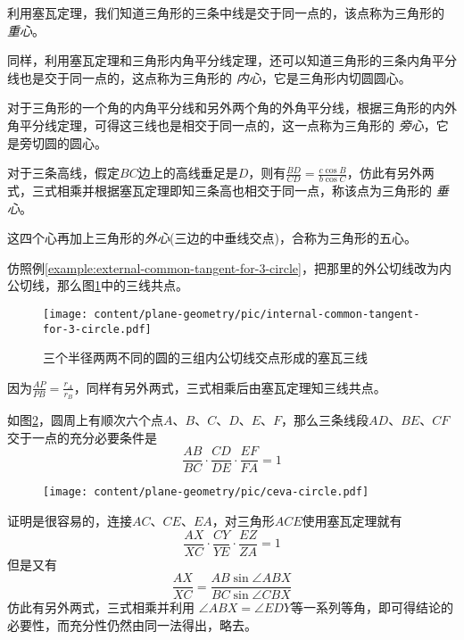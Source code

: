 \begin{example}[三角形的几个心]
 利用塞瓦定理，我们知道三角形的三条中线是交于同一点的，该点称为三角形的 \emph{重心}。

 同样，利用塞瓦定理和三角形内角平分线定理，还可以知道三角形的三条内角平分线也是交于同一点的，这点称为三角形的 \emph{内心}，它是三角形内切圆圆心。

 对于三角形的一个角的内角平分线和另外两个角的外角平分线，根据三角形的内外角平分线定理，可得这三线也是相交于同一点的，这一点称为三角形的 \emph{旁心}，它是旁切圆的圆心。

 对于三条高线，假定$BC$边上的高线垂足是$D$，则有$\frac{BD}{CD}=\frac{c \cos{B}}{b \cos{C}}$，仿此有另外两式，三式相乘并根据塞瓦定理即知三条高也相交于同一点，称该点为三角形的 \emph{垂心}。

这四个心再加上三角形的\emph{外心}(三边的中垂线交点)，合称为三角形的五心。 
\end{example}

\begin{example}
  仿照例\ref{example:external-common-tangent-for-3-circle}，把那里的外公切线改为内公切线，那么图\ref{fig:internal-common-tangent-for-3-circle}中的三线共点。
 
\begin{figure}[htbp]
\centering
\texttt{[image: content/plane-geometry/pic/internal-common-tangent-for-3-circle.pdf]}
\caption{三个半径两两不同的圆的三组内公切线交点形成的塞瓦三线}
\label{fig:internal-common-tangent-for-3-circle}
\end{figure}

因为$\frac{AP}{PB}=\frac{r_A}{r_B}$，同样有另外两式，三式相乘后由塞瓦定理知三线共点。
\end{example}

\begin{example}
  如图\ref{fig:ceva-circle}，圆周上有顺次六个点$A$、$B$、$C$、$D$、$E$、$F$，那么三条线段$AD$、$BE$、$CF$交于一点的充分必要条件是
  \begin{equation*}
    \frac{AB}{BC} \cdot \frac{CD}{DE} \cdot \frac{EF}{FA} = 1
  \end{equation*}
 
\begin{figure}[htbp]
\centering
\texttt{[image: content/plane-geometry/pic/ceva-circle.pdf]}
\caption{}
\label{fig:ceva-circle}
\end{figure}

证明是很容易的，连接$AC$、$CE$、$EA$，对三角形$ACE$使用塞瓦定理就有
\begin{equation*}
  \frac{AX}{XC} \cdot \frac{CY}{YE} \cdot \frac{EZ}{ZA} = 1
\end{equation*}
但是又有
\begin{equation*}
  \frac{AX}{XC} = \frac{AB \sin{\angle ABX}}{BC \sin{\angle CBX}}
\end{equation*}
仿此有另外两式，三式相乘并利用 $\angle ABX = \angle EDY$等一系列等角，即可得结论的必要性，而充分性仍然由同一法得出，略去。
\end{example}

